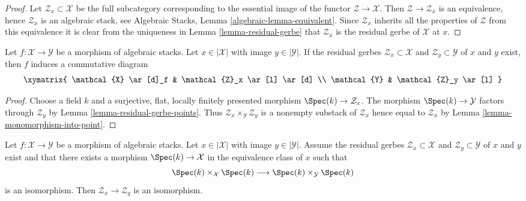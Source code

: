 \begin{proof}
Let $\mathcal{Z}_x \subset \mathcal{X}$ be the full subcategory corresponding
to the essential image of the functor $\mathcal{Z} \to \mathcal{X}$.
Then $\mathcal{Z} \to \mathcal{Z}_x$ is an equivalence, hence
$\mathcal{Z}_x$ is an algebraic stack, see
Algebraic Stacks, Lemma \ref{algebraic-lemma-equivalent}.
Since $\mathcal{Z}_x$ inherits all the properties of $\mathcal{Z}$ from
this equivalence it is clear from the uniqueness in
Lemma \ref{lemma-residual-gerbe}
that $\mathcal{Z}_x$ is the residual gerbe of $\mathcal{X}$ at $x$.
\end{proof}

\begin{lemma}
\label{lemma-residual-gerbe-functorial}
Let $f : \mathcal{X} \to \mathcal{Y}$ be a morphism of algebraic stacks.
Let $x \in |\mathcal{X}|$ with image $y \in |\mathcal{Y}|$.
If the residual gerbes $\mathcal{Z}_x \subset \mathcal{X}$
and $\mathcal{Z}_y \subset \mathcal{Y}$ of $x$ and $y$ exist,
then $f$ induces a commutative diagram
$$
\xymatrix{
\mathcal{X} \ar[d]_f & \mathcal{Z}_x \ar[l] \ar[d] \\
\mathcal{Y} & \mathcal{Z}_y \ar[l]
}
$$
\end{lemma}

\begin{proof}
Choose a field $k$ and a surjective, flat, locally finitely presented
morphism $\Spec(k) \to \mathcal{Z}_x$. The morphism
$\Spec(k) \to \mathcal{Y}$ factors through $\mathcal{Z}_y$ by
Lemma \ref{lemma-residual-gerbe-points}.
Thus $\mathcal{Z}_x \times_\mathcal{Y} \mathcal{Z}_y$
is a nonempty substack of $\mathcal{Z}_x$
hence equal to $\mathcal{Z}_x$ by Lemma \ref{lemma-monomorphism-into-point}.
\end{proof}

\begin{lemma}
\label{lemma-residual-gerbe-isomorphic}
Let $f : \mathcal{X} \to \mathcal{Y}$ be a morphism of algebraic stacks.
Let $x \in |\mathcal{X}|$ with image $y \in |\mathcal{Y}|$.
Assume the residual gerbes $\mathcal{Z}_x \subset \mathcal{X}$
and $\mathcal{Z}_y \subset \mathcal{Y}$ of $x$ and $y$ exist
and that there exists a morphism $\Spec(k) \to \mathcal{X}$
in the equivalence class of $x$ such that
$$
\Spec(k) \times_\mathcal{X} \Spec(k)
\longrightarrow
\Spec(k) \times_\mathcal{Y} \Spec(k)
$$
is an isomorphism. Then $\mathcal{Z}_x \to \mathcal{Z}_y$
is an isomorphism.
\end{lemma}

